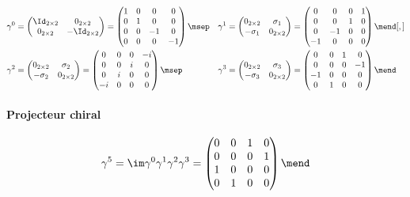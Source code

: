 \begin{align*}
\gamma^{0} &= \begin{pmatrix}\Id_{2\times2} & 0_{2\times2}\\0_{2\times2} & -\Id_{2\times2}\end{pmatrix} = \begin{pmatrix}1&0&0&0\\0&1&0&0\\0&0&-1&0\\0&0&0&-1\end{pmatrix}
\msep&
\gamma^{1} &= \begin{pmatrix}0_{2\times2} & \sigma_1\\-\sigma_1 & 0_{2\times2}\end{pmatrix} = \begin{pmatrix}0&0&0&1\\0&0&1&0\\0&-1&0&0\\-1&0&0&0\end{pmatrix} \mend[,]
\\
\gamma^{2} &= \begin{pmatrix}0_{2\times2} & \sigma_2\\-\sigma_2 & 0_{2\times2}\end{pmatrix} = \begin{pmatrix}0&0&0&-i\\0&0&i&0\\0&i&0&0\\-i&0&0&0\end{pmatrix}
\msep&
\gamma^{3} &= \begin{pmatrix}0_{2\times2} & \sigma_3\\-\sigma_3 & 0_{2\times2}\end{pmatrix} = \begin{pmatrix}0&0&1&0\\0&0&0&-1\\-1&0&0&0\\0&1&0&0\end{pmatrix} \mend
\end{align*}

\paragraph{Projecteur chiral}

\begin{equation*}
\gamma^5 = \im\gamma^0\gamma^1\gamma^2\gamma^3 = \begin{pmatrix}0&0&1&0\\0&0&0&1\\1&0&0&0\\0&1&0&0\end{pmatrix}\mend
\end{equation*}

